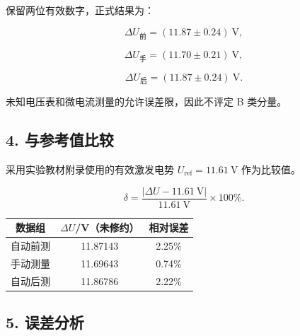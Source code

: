 保留两位有效数字，正式结果为：

\begin{equation}
\boxed{\Delta U_{\text{前}}=(11.87\pm0.24)\ \mathrm V},
\end{equation}

\begin{equation}
\boxed{\Delta U_{\text{手}}=(11.70\pm0.21)\ \mathrm V},
\end{equation}

\begin{equation}
\boxed{\Delta U_{\text{后}}=(11.87\pm0.24)\ \mathrm V}.
\end{equation}

未知电压表和微电流测量的允许误差限，因此不评定 B 类分量。

\subsection*{4. 与参考值比较}

采用实验教材附录使用的有效激发电势 $U_{\text{ref}}=11.61\ \mathrm V$ 作为比较值。

\begin{equation}
\delta=\frac{|\Delta U-11.61\ \mathrm V|}{11.61\ \mathrm V}\times100\%.
\end{equation}

\begin{center}
\begin{minipage}{\linewidth}
\centering

{\small
\setlength{\tabcolsep}{6pt}
\renewcommand{\arraystretch}{1.15}
\begin{tabular}{ccc}
\toprule

数据组 & $\Delta U$/V（未修约） & 相对误差 \\

\midrule

自动前测 & 11.87143 & 2.25\% \\

手动测量 & 11.69643 & 0.74\% \\

自动后测 & 11.86786 & 2.22\% \\

\bottomrule

\end{tabular}
}

\end{minipage}
\end{center}

\subsection*{5. 误差分析}

